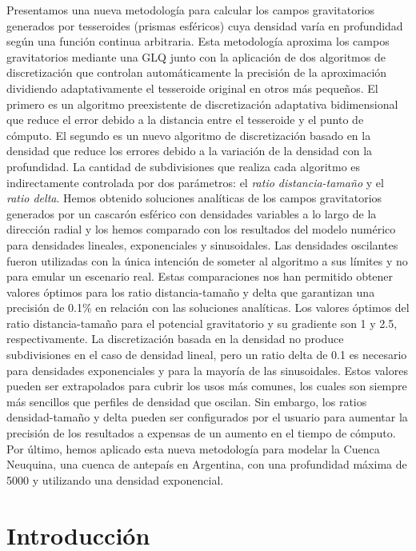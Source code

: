 Presentamos una nueva metodología para calcular los campos gravitatorios
generados por tesseroides (prismas esféricos) cuya densidad varía en
profundidad según una función continua arbitraria.
Esta metodología aproxima los campos gravitatorios mediante una \ac{GLQ} junto
con la aplicación de dos algoritmos de discretización que controlan
automáticamente la precisión de la aproximación dividiendo adaptativamente el
tesseroide original en otros más pequeños.
El primero es un algoritmo preexistente de discretización adaptativa
bidimensional que reduce el error debido a la distancia entre el tesseroide
y el punto de cómputo.
El segundo es un nuevo algoritmo de discretización basado en la densidad que
reduce los errores debido a la variación de la densidad con la profundidad.
La cantidad de subdivisiones que realiza cada algoritmo es indirectamente
controlada por dos parámetros: el \emph{ratio distancia-tamaño} y el
\emph{ratio delta}.
Hemos obtenido soluciones analíticas de los campos gravitatorios generados por
un cascarón esférico con densidades variables a lo largo de la dirección radial
y los hemos comparado con los resultados del modelo numérico para densidades
lineales, exponenciales y sinusoidales.
Las densidades oscilantes fueron utilizadas con la única intención de someter
al algoritmo a sus límites y no para emular un escenario real.
Estas comparaciones nos han permitido obtener valores óptimos para los ratio
distancia-tamaño y delta que garantizan una precisión de 0.1\% en relación con
las soluciones analíticas.
Los valores óptimos del ratio distancia-tamaño para el potencial gravitatorio
y su gradiente son 1 y 2.5, respectivamente.
La discretización basada en la densidad no produce subdivisiones en el caso de
densidad lineal, pero un ratio delta de 0.1 es necesario para densidades
exponenciales y para la mayoría de las sinusoidales.
Estos valores pueden ser extrapolados para cubrir los usos más comunes, los
cuales son siempre más sencillos que perfiles de densidad que oscilan.
Sin embargo, los ratios densidad-tamaño y delta pueden ser configurados por el
usuario para aumentar la precisión de los resultados a expensas de un aumento
en el tiempo de cómputo.
Por último, hemos aplicado esta nueva metodología para modelar la Cuenca
Neuquina, una cuenca de antepaís en Argentina, con una profundidad máxima de
5000\m{} y utilizando una densidad exponencial.


\section{Introducción}

